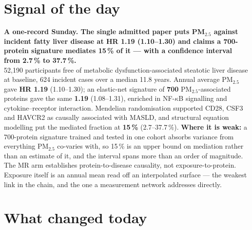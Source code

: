 \documentclass[10pt]{article}
\begin{document}
\vspace{6mm}

\section*{\sffamily\bfseries\color{Deep}Signal of the day}
\vspace{-1.5mm}{\color{Amber}\rule{\linewidth}{1.1pt}}\vspace{2.5mm}

\begin{keybox}
{\sffamily\bfseries\small\color{Deep}A one-record Sunday. The single admitted paper puts
PM$_{2.5}$ against incident fatty liver disease at HR 1.19 (1.10--1.30) and claims a 700-protein signature
mediates 15\,\% of it --- with a confidence interval from 2.7\,\% to 37.7\,\%.}\\[1.4mm]
\footnotesize
52,190 participants free of metabolic dysfunction-associated steatotic liver disease at baseline, 624
incident cases over a median 11.8 years. Annual average PM$_{2.5}$ gave \textbf{HR 1.19} (1.10--1.30); an
elastic-net signature of \textbf{700} PM$_{2.5}$-associated proteins gave the same \textbf{1.19}
(1.08--1.31), enriched in NF-$\kappa$B signalling and cytokine--receptor interaction. Mendelian
randomisation supported CD28, CSF3 and HAVCR2 as causally associated with MASLD, and structural equation
modelling put the mediated fraction at \textbf{15\,\%} (2.7--37.7\,\%).
\textbf{Where it is weak:} a 700-protein signature trained and tested in one cohort absorbs variance from
everything PM$_{2.5}$ co-varies with, so 15\,\% is an upper bound on mediation rather than an estimate of
it, and the interval spans more than an order of magnitude. The MR arm establishes protein-to-disease
causality, not exposure-to-protein. Exposure itself is an annual mean read off an interpolated surface ---
the weakest link in the chain, and the one a measurement network addresses directly.\par
\end{keybox}

\vspace{3mm}

\section*{\sffamily\bfseries\color{Deep}What changed today}
\vspace{-1.5mm}{\color{Amber}\rule{\linewidth}{1.1pt}}\vspace{2.5mm}
\end{document}
